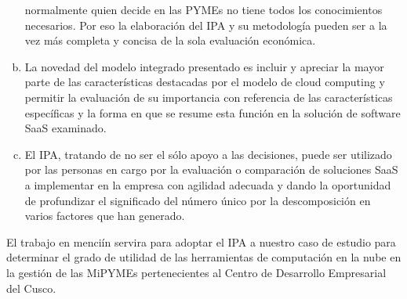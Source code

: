 \begin{enumerate}[a.]
            normalmente quien decide en las PYMEs no tiene todos los conocimientos
            necesarios. Por eso la elaboraci\'on del IPA y su metodolog\'ia pueden
            ser a la vez m\'as completa y concisa de la sola evaluaci\'on econ\'omica.
      \item La novedad del modelo integrado presentado es incluir y apreciar la
            mayor parte de las caracter\'isticas destacadas por el modelo de cloud
            computing y permitir la evaluaci\'on de su importancia con referencia
            de las caracter\'isticas espec\'ificas y la forma en que se resume esta
            funci\'on en la soluci\'on de software SaaS examinado.
      \item El IPA, tratando de no ser el s\'olo apoyo a las decisiones, puede ser
            utilizado por las personas en cargo por la evaluaci\'on o comparaci\'on de
            soluciones SaaS a implementar en la empresa con agilidad adecuada y
            dando la oportunidad de profundizar el significado del n\'umero \'unico
            por la descomposici\'on en varios factores que han generado.
\end{enumerate}

El trabajo en menci\'in servira para adoptar el IPA a nuestro caso de estudio para
determinar el grado de utilidad de las herramientas de computaci\'on en la nube
en la gesti\'on de las MiPYMEs pertenecientes al Centro de Desarrollo Empresarial
del Cusco.

